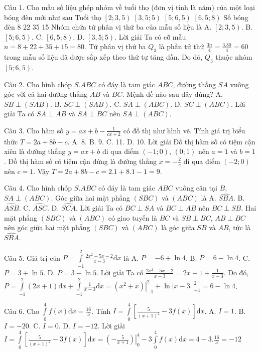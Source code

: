 Câu 1. Cho mẫu số liệu ghép nhóm về tuổi thọ (đơn vị tính là năm) của một loại bóng đèn mới như sau
Tuổi thọ  $\left[ 2;3,5 \right)$  $\left[ 3,5;5 \right)$  $\left[ 5;6,5 \right)$  $\left[ 6,5;8 \right)$
Số bóng đèn  8  22  35  15
Nhóm chứa tứ phân vị thứ ba của mẫu số liệu là
A. $\left[ 2;3,5 \right)$.  B. $\left[ 5;6,5 \right)$.  C. $\left[ 6,5;8 \right)$.  D. $\left[ 3,5;5 \right)$.
Lời giải
Ta có cỡ mẫu $n=8+22+35+15=80$. Tứ phân vị thứ ba $Q_3$ là phần tử thứ $\frac{3n}{4}=\frac{3.80}{4}=60$ trong mẫu số liệu đã được sắp xếp theo thứ tự tăng dần. Do đó, $Q_3$ thuộc nhóm $\left[ 5;6,5 \right)$.

Câu 2. Cho hình chóp ${S.ABC}$ có đáy là tam giác ${ABC}$, đường thẳng ${SA}$ vuông góc với cả hai đường thẳng ${AB}$ và ${BC}$. Mệnh đề nào sau đây đúng?
A. $SB \perp \left(SAB\right)$.  B. $SC \perp \left(SAB\right)$.  C. $SA \perp \left(ABC\right)$.  D. $SC \perp \left(ABC\right)$.
Lời giải
Ta có $SA \perp AB$ và $SA \perp BC$ nên $SA \perp \left(ABC\right)$.

Câu 3. Cho hàm số $y= ax+b - \frac{1}{cx+2}$ có đồ thị như hình vẽ. Tính giá trị biểu thức $T=2a+8b-c$.
A. 8.  B. 9. C. 11.  D. 10.
Lời giải
Đồ thị hàm số có tiệm cận xiên là đường thẳng $y=ax+b$ đi qua điểm $\left( -1;0 \right)$, $\left( 0;1 \right)$ nên $a=1$ và $b=1$.
Đồ thị hàm số có tiệm cận đứng là đường thẳng $x=-\frac{2}{c}$ đi qua điểm $\left( -2;0 \right)$ nên $c=1$.
Vậy $T=2a+8b-c=2.1+8.1-1=9$.

Câu 4. Cho hình chóp ${S.ABC}$ có đáy là tam giác ${ABC}$ vuông cân tại ${B}$, $SA \perp \left( ABC \right)$. Góc giữa hai mặt phẳng $\left( SBC \right)$ và $\left( ABC \right)$ là
A. $\widehat{SBA}$.  B. $\widehat{ASB}$.  C. $\widehat{ASC}$.  D. $\widehat{SCA}$.
Lời giải
Ta có $BC \perp SA$ và $BC \perp AB$ nên $BC \perp SB$.
Hai mặt phẳng $\left( SBC \right)$ và $\left( ABC \right)$ có giao tuyến là $BC$ và $SB \perp BC$, $AB \perp BC$ nên góc giữa hai mặt phẳng $\left( SBC \right)$ và $\left( ABC \right)$ là góc giữa $SB$ và $AB$, tức là $\widehat{SBA}$.

Câu 5. Giá trị của $P = \int \limits_{-1}^{2} {\frac{2x^2-5x-2}{x-3} \text{d}x}$ là
A. $P= -6 + \ln 4$.  B. $P= 6 - \ln 4$.  C. $P= 3 + \ln 5$.  D. $P= 3 - \ln 5$.
Lời giải
Ta có $\frac{2x^2-5x-2}{x-3} = 2x+1 + \frac{1}{x-3}$.
Do đó, $P = \int \limits_{-1}^{2} {(2x+1) \text{d}x} + \int \limits_{-1}^{2} {\frac{1}{x-3} \text{d}x} = \left. \left( x^2+x \right) \right|_{-1}^{2} + \left. \ln |x-3| \right|_{-1}^{2} = 6 - \ln 4$.

Câu 6. Cho $\int \limits_{0}^{4} {f\left(x\right) \text{d}x} = \frac{16}{3}$. Tính $I = \int \limits_{0}^{4} {\left[\frac{5}{\left(x+1\right)^2} -3 f\left(x\right) \right] \text{d}x}$.
A. $I=1$.  B. $I=-20$.  C. $I=0$.  D. $I=-12$.
Lời giải
$I = \int \limits_{0}^{4} {\left[\frac{5}{\left(x+1\right)^2} -3 f\left(x\right) \right] \text{d}x} = \left.\left(-\frac{5}{x+1} \right)\right|_{0}^{4} - 3 \int \limits_{0}^{4} {f\left(x\right) \text{d}x} = 4 - 3.\frac{16}{3}=-12 $